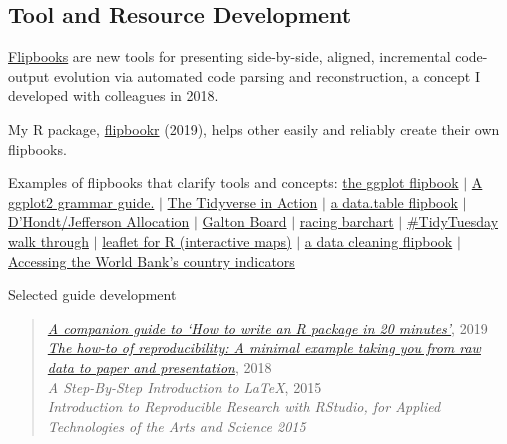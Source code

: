 \documentclass[margin, 10pt]{CVStyleTemplate}\usepackage[]{graphicx}\usepackage[dvipsnames]{xcolor}
\begin{document}
\begin{resume}
\section{Tool and Resource Development}

\href{https://evamaerey.github.io/little_flipbooks_library/about/what_the_flipbook}{Flipbooks} are new tools for presenting side-by-side, aligned, incremental code-output evolution via automated code parsing and reconstruction, a concept I developed with colleagues in 2018.



My R package, \href{https://github.com/EvaMaeRey/flipbookr}{flipbookr} (2019), helps other easily and reliably create their own flipbooks.

Examples of flipbooks that clarify tools and concepts: \href{https://github.com/EvaMaeRey/ggplot_flipbook}{the ggplot flipbook}
$|$ \href{https://evamaerey.github.io/ggplot2_grammar_guide/ggplot2_grammar_guide}{A ggplot2 grammar guide.}
$|$ \href{https://github.com/EvaMaeRey/tidyverse_in_action}{The Tidyverse in Action}
$|$  \href{https://evamaerey.github.io/little_flipbooks_library/data.table/data.table}{a data.table flipbook}
$|$ \href{https://evamaerey.github.io/little_flipbooks_library/dhondt_jefferson_allocation/dhondt_jefferson_allocation}{D’Hondt/Jefferson Allocation}
$|$ \href{https://evamaerey.github.io/little_flipbooks_library/galton_board/galton_board.html#1}{Galton Board}
$|$ \href{https://evamaerey.github.io/little_flipbooks_library/racing_bars/racing_barcharts.html}{racing barchart}
$|$  \href{https://evamaerey.github.io/tidytuesday_walk_through/tidytuesday_highlights.html}{\#TidyTuesday walk through}
$|$  \href{https://evamaerey.github.io/little_flipbooks_library/leaflet/leaflet#1}{leaflet for R (interactive maps)}
$|$ \href{https://evamaerey.github.io/little_flipbooks_library/data_cleaning/data_cleaning#1}{a data cleaning flipbook}
$|$  \href{https://evamaerey.github.io/little_flipbooks_library/wbstats/wbstats#1}{Accessing the World Bank's country indicators}



Selected guide development

\begin{quotation}\noindent
\emph{\href{https://evamaerey.github.io/package_in_20_minutes/package_in_20_minutes}{A companion guide to `How to write an R package in 20 minutes'}}, 2019 \\[6pt]
\emph{\href{https://github.com/EvaMaeRey/from_raw_data_to_paper_and_presentation}{The how-to of reproducibility: A minimal example taking you from raw data to paper and presentation}}, 2018 \\[6pt]
\emph{A Step-By-Step Introduction to \LaTeX}, 2015\\[6pt]%
\emph{Introduction to Reproducible Research with RStudio, for Applied Technologies of the Arts and Science 2015}%
\end{quotation}
%


\end{resume}
\end{document}

